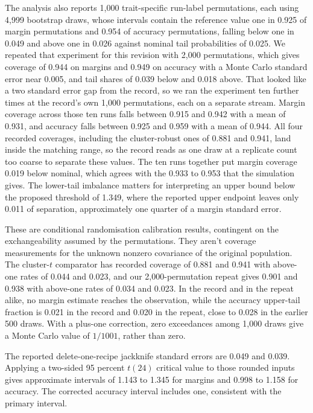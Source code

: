The analysis also reports 1,000 trait-specific run-label permutations, each using 4,999 bootstrap draws, whose intervals contain the reference value one in 0.925 of margin permutations and 0.954 of accuracy permutations, falling below one in 0.049 and above one in 0.026 against nominal tail probabilities of 0.025. We repeated that experiment for this revision with 2,000 permutations, which gives coverage of 0.944 on margins and 0.949 on accuracy with a Monte Carlo standard error near 0.005, and tail shares of 0.039 below and 0.018 above. That looked like a two standard error gap from the record, so we ran the experiment ten further times at the record's own 1,000 permutations, each on a separate stream. Margin coverage across those ten runs falls between 0.915 and 0.942 with a mean of 0.931, and accuracy falls between 0.925 and 0.959 with a mean of 0.944. All four recorded coverages, including the cluster-robust ones of 0.881 and 0.941, land inside the matching range, so the record reads as one draw at a replicate count too coarse to separate these values. The ten runs together put margin coverage 0.019 below nominal, which agrees with the 0.933 to 0.953 that the simulation gives. The lower-tail imbalance matters for interpreting an upper bound below the proposed threshold of 1.349, where the reported upper endpoint leaves only 0.011 of separation, approximately one quarter of a margin standard error.

These are conditional randomisation calibration results, contingent on the exchangeability assumed by the permutations. They aren't coverage measurements for the unknown nonzero covariance of the original population. The cluster-$t$ comparator has recorded coverage of 0.881 and 0.941 with above-one rates of 0.044 and 0.023, and our 2,000-permutation repeat gives 0.901 and 0.938 with above-one rates of 0.034 and 0.023. In the record and in the repeat alike, no margin estimate reaches the observation, while the accuracy upper-tail fraction is 0.021 in the record and 0.020 in the repeat, close to 0.028 in the earlier 500 draws. With a plus-one correction, zero exceedances among 1,000 draws give a Monte Carlo value of $1/1001$, rather than zero.

The reported delete-one-recipe jackknife standard errors are 0.049 and 0.039. Applying a two-sided 95 percent $t(24)$ critical value to those rounded inputs gives approximate intervals of 1.143 to 1.345 for margins and 0.998 to 1.158 for accuracy. The corrected accuracy interval includes one, consistent with the primary interval.

